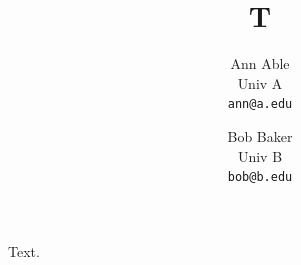 \documentclass{article}
\begin{document}
\title{T}
\author{\begin{tabular}{c}Ann Able\\ Univ A\\ \texttt{ann@a.edu}\end{tabular}
\and \begin{tabular}{c}Bob Baker\\ Univ B\\ \texttt{bob@b.edu}\end{tabular}}
\maketitle
Text.
\end{document}

